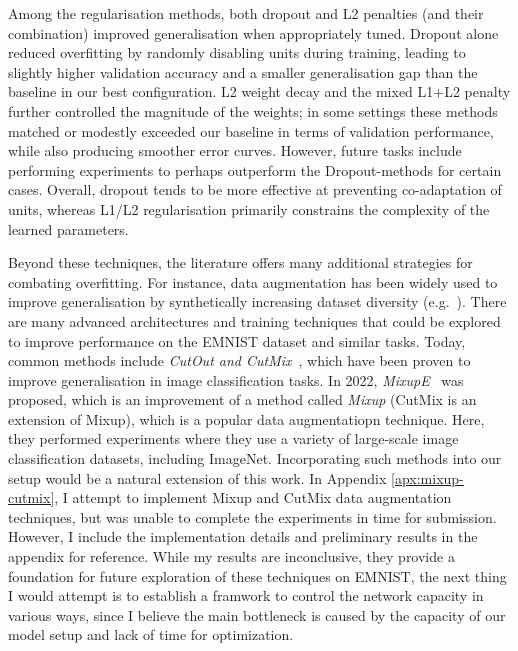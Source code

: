 {{Among the regularisation methods, both dropout and L2 penalties (and their combination) improved generalisation when appropriately tuned. Dropout alone reduced overfitting by randomly disabling units during training, leading to slightly higher validation accuracy and a smaller generalisation gap than the baseline in our best configuration. L2 weight decay and the mixed L1+L2 penalty further controlled the magnitude of the weights; in some settings these methods matched or modestly exceeded our baseline in terms of validation performance, while also producing smoother error curves. However, future tasks include performing experiments to perhaps outperform the Dropout-methods for certain cases. Overall, dropout tends to be more effective at preventing co-adaptation of units, whereas L1/L2 regularisation primarily constrains the complexity of the learned parameters.

Beyond these techniques, the literature offers many additional strategies for combating overfitting. For instance, data augmentation has been widely used to improve generalisation by synthetically increasing dataset diversity (e.g.\ \citet{oh2024provablebenefitcutoutcutmix}). There are many advanced architectures and training techniques that could be explored to improve performance on the EMNIST dataset and similar tasks. Today, common methods include \textit{CutOut and CutMix}~\cite{oh2024provablebenefitcutoutcutmix}, which have been proven to improve generalisation in image classification tasks. In 2022, \textit{MixupE}~\cite{zou2023mixupeunderstandingimprovingmixup} was proposed, which is an improvement of a method called \textit{Mixup} (CutMix is an extension of Mixup), which is a popular data augmentatiopn technique. Here, they performed experiments where they use a variety of large-scale image classification datasets, including ImageNet. Incorporating such methods into our setup would be a natural extension of this work. In Appendix \ref{apx:mixup-cutmix}, I attempt to implement Mixup and CutMix data augmentation techniques, but was unable to complete the experiments in time for submission. However, I include the implementation details and preliminary results in the appendix for reference. While my results are inconclusive, they provide a foundation for future exploration of these techniques on EMNIST, the next thing I would attempt is to establish a framwork to control the network capacity in various ways, since I believe the main bottleneck is caused by the capacity of our model setup and lack of time for optimization.

}}
